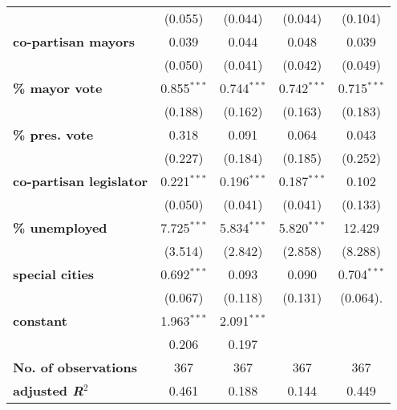 \begin{table}[!htbp]
{\begin{threeparttable}
\begin{tabular}{lcccc}
                                         & (0.055)         & (0.044)       & (0.044)       & (0.104)             \\
\textbf{co-partisan mayors}              & 0.039           & 0.044         & 0.048         & 0.039               \\
                                         & (0.050)         & (0.041)       & (0.042)       & (0.049)             \\
\textbf{\% mayor vote}                    & 0.855$^{***}$   & 0.744$^{***}$ & 0.742$^{***}$ & 0.715$^{***}$       \\
                                         & (0.188)         & (0.162)       & (0.163)       & (0.183)             \\
\textbf{\% pres. vote}                    & 0.318           & 0.091         & 0.064         & 0.043               \\
                                         & (0.227)         & (0.184)       & (0.185)       & (0.252)             \\
\textbf{co-partisan legislator}          & 0.221$^{***}$   & 0.196$^{***}$ & 0.187$^{***}$ & 0.102               \\
                                         & (0.050)         & (0.041)       & (0.041)       & (0.133)             \\
\textbf{\% unemployed}                    & 7.725$^{***}$   & 5.834$^{***}$ & 5.820$^{***}$ & 12.429              \\
                                         & (3.514)         & (2.842)       & (2.858)       & (8.288)             \\
\textbf{special cities }                 & 0.692$^{***}$   & 0.093         & 0.090         & 0.704$^{***}$       \\
                                         & (0.067)         & (0.118)       & (0.131)       & (0.064).            \\
\textbf{constant}                        & 1.963$^{***}$   & 2.091$^{***}$ &               &                     \\
                                         & 0.206           & 0.197         &               &                     \\
\midrule 
\textbf{No. of observations}            & 367             & 367           & 367           & 367                 \\
\textbf{adjusted \textit{R}$^{2}$}      & 0.461           & 0.188         & 0.144         & 0.449               \\

\end{tabular}
\end{threeparttable}}
\end{table}
